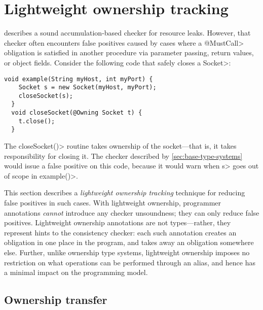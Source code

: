 \section{Lightweight ownership tracking}
\label{sec:lightweight-ownership}

 describes a sound accumulation-based
checker for resource leaks. However, that checker often encounters false
positives caused by cases where a \<@MustCall> obligation is satisfied
in another procedure via parameter passing, return values, or object fields.
Consider the following code that safely closes a \<Socket>:

\begin{lstlisting}[frame=tb,belowskip=3mm]
  void example(String myHost, int myPort) {
    Socket s = new Socket(myHost, myPort);
    closeSocket(s);
  }
  void closeSocket(@Owning Socket t) {
    t.close();
  }  
\end{lstlisting}

The \<closeSocket()> routine takes ownership of the socket---that is,
it takes responsibility for closing it. The checker described by
\cref{sec:base-type-systems} would issue a false positive on this
code, because it would warn when \<s>
goes out of scope in \<example()>.

This section describes a \emph{lightweight ownership tracking} technique for reducing
false positives in such cases.  With lightweight ownership, programmer
annotations \emph{cannot} introduce any checker unsoundness; they can only
reduce false positives.
Lightweight ownership annotations are not types---rather, they represent
hints to the consistency checker: each such annotation creates an obligation
in one place in the program, and takes away an obligation somewhere else.
Further, unlike ownership type systems,
lightweight ownership imposes no restriction on what operations can be performed
through an alias, and hence has a minimal impact on the programming model.

\subsection{Ownership transfer}
\label{sec:ownership-transfer}

